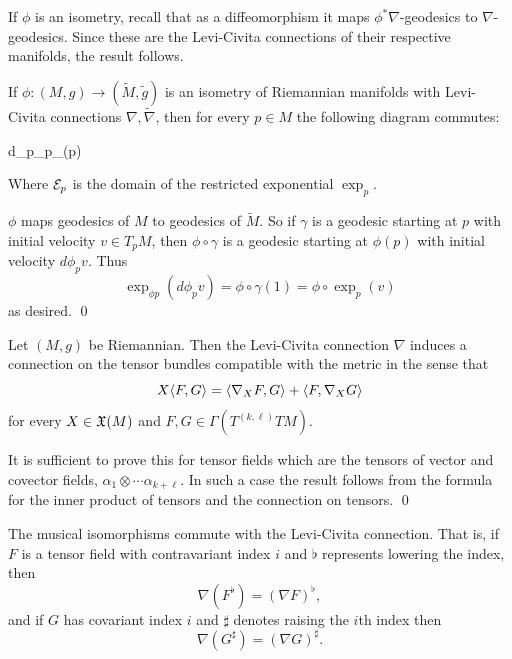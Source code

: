 \ecoro

\bproof

    If $\phi$ is an isometry, recall that as a diffeomorphism it maps $\phi^*\nabla$-geodesics to $\nabla$-geodesics.
    Since these are the Levi-Civita connections of their respective manifolds, the result follows.

\eproof

\bcoro[title=Naturality of the exponential map]

    If $\phi\colon(M,g)\to(\tilde M,\tilde g)$ is an isometry of Riemannian manifolds with Levi-Civita connections
    $\nabla,\tilde\nabla$, then for every $p\in M$ the following diagram commutes:

        {d\phi_p}{\phi}{\exp_p}{\exp_{\phi(p)}}

    Where ${{\cal E}}_p$ is the domain of the restricted exponential $\exp_p$.

\ecoro

\bproof

    $\phi$ maps geodesics of $M$ to geodesics of $\tilde M$.
    So if $\gamma$ is a geodesic starting at $p$ with initial velocity $v\in T_pM$, then $\phi\circ\gamma$ is a geodesic
    starting at $\phi(p)$ with initial velocity $d\phi_pv$.
    Thus
    $$ \exp_{\phi p}(d\phi_pv) = \phi\circ\gamma(1) = \phi\circ\exp_p(v) $$
    as desired.
    \qed

\eproof

\bprop

    Let $(M,g)$ be Riemannian.
    Then the Levi-Civita connection $\nabla$ induces a connection on the tensor bundles compatible with the metric in the
    sense that
    $$ X\mathopen{}\mathclose{\left<F,G\right>} = \mathopen{}\mathclose{\left<\nabla_XF,G\right>} + \mathopen{}\mathclose{\left<F,\nabla_XG\right>} $$
    for every $X\in{\frak X}(M)$ and $F,G\in\Gamma(T^{(k,\ell)}TM)$.

\eprop

\bproof

    It is sufficient to prove this for tensor fields which are the tensors of vector and covector fields,
    $\alpha_1\otimes\cdots\alpha_{k+\ell}$.
    In such a case the result follows from the formula for the inner product of tensors and the connection on tensors.
    \qed

\eproof

\bprop

    The musical isomorphisms commute with the Levi-Civita connection.
    That is, if $F$ is a tensor field with contravariant index $i$ and $\flat$ represents lowering the index, then
    $$ \nabla(F^\flat) = (\nabla F)^\flat , $$
    and if $G$ has covariant index $i$ and $\sharp$ denotes raising the $i$th index then
    $$ \nabla(G^\sharp) = (\nabla G)^\sharp . $$

